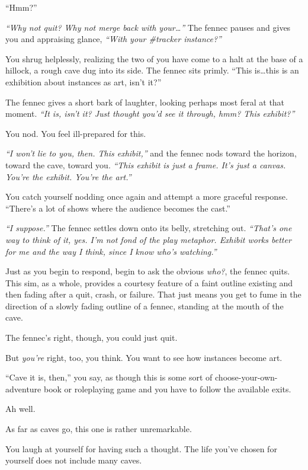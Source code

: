 ``Hmm?''

\emph{``Why not quit? Why not merge back with your\ldots{}''} The fennec pauses and gives you and appraising glance, \emph{``With your \#tracker instance?''}

You shrug helplessly, realizing the two of you have come to a halt at the base of a hillock, a rough cave dug into its side. The fennec sits primly. ``This is\ldots{}this is an exhibition about instances as art, isn't it?''

The fennec gives a short bark of laughter, looking perhaps most feral at that moment. \emph{``It is, isn't it? Just thought you'd see it through, hmm? This exhibit?''}

You nod. You feel ill-prepared for this.

\emph{``I won't lie to you, then. This exhibit,''} and the fennec nods toward the horizon, toward the cave, toward you. \emph{``This exhibit is just a frame. It's just a canvas. You're the exhibit. You're the art.''}

You catch yourself nodding once again and attempt a more graceful response. ``There's a lot of shows where the audience becomes the cast.''

\emph{``I suppose.''} The fennec settles down onto its belly, stretching out. \emph{``That's one way to think of it, yes. I'm not fond of the play metaphor. Exhibit works better for me and the way I think, since I know who's watching.''}

Just as you begin to respond, begin to ask the obvious \emph{who?}, the fennec quits. This sim, as a whole, provides a courtesy feature of a faint outline existing and then fading after a quit, crash, or failure. That just means you get to fume in the direction of a slowly fading outline of a fennec, standing at the mouth of the cave.

The fennec's right, though, you could just quit.

But \emph{you're} right, too, you think. You want to see how instances become art.

``Cave it is, then,'' you say, as though this is some sort of choose-your-own-adventure book or roleplaying game and you have to follow the available exits.

Ah well.

\newpage
\null
\vfill

As far as caves go, this one is rather unremarkable.

You laugh at yourself for having such a thought. The life you've chosen for yourself does not include many caves.


